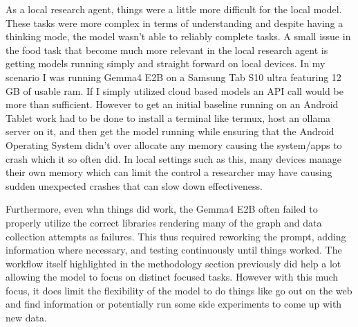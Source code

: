 \documentclass[sigconf]{acmart}
\begin{document}
As a local research agent, things were a little more difficult for the local model. These tasks were more complex in terms of understanding and despite having a thinking mode, the model wasn't able to reliably complete tasks. A small issue in the food task that become much more relevant in the local research agent is getting models running simply and straight forward on local devices. In my scenario I was running Gemma4 E2B on a Samsung Tab S10 ultra featuring 12 GB of usable ram. If I simply utilized cloud based models an API call would be more than sufficient. However to get an initial baseline running on an Android Tablet work had to be done to install a terminal like termux, host an ollama server on it, and then get the model running while ensuring that the Android Operating System didn't over allocate any memory causing the system/apps to crash which it so often did. In local settings such as this, many devices manage their own memory which can limit the control a researcher may have causing sudden unexpected crashes that can slow down effectiveness.

Furthermore, even whn things did work, the Gemma4 E2B often failed to properly utilize the correct libraries rendering many of the graph and data collection attempts as failures. This thus required reworking the prompt, adding information where necessary, and testing continuously until things worked. The workflow itself highlighted in the methodology section previously did help a lot  allowing the model to focus on distinct focused tasks. However with this much focus, it does limit the flexibility of the model to do things like go out on the web and find information or potentially run some side experiments to come up with new data.
\end{document}
